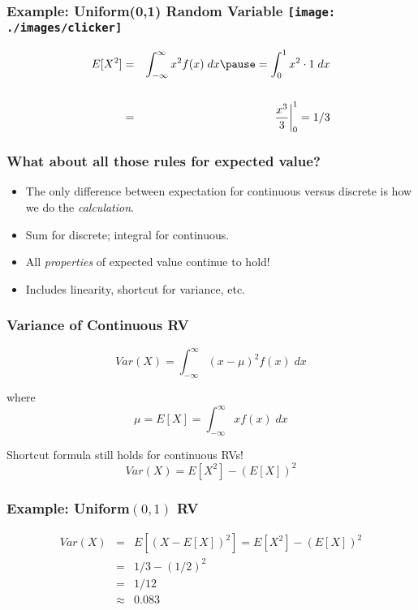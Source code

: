 
\begin{frame}
\frametitle{Example: Uniform(0,1) Random Variable \hfill \texttt{[image: ./images/clicker]}}
	\begin{eqnarray*}
	E[X^2] &=& \int_{-\infty}^\infty x^2 f(x) \; dx \pause = \int_0^1 x^2 \cdot 1 \; dx\\ \\
		&=& \left. \frac{x^3}{3}\right|_0^1 = 1/3
	\end{eqnarray*}
\end{frame}


\begin{frame}
\frametitle{What about all those rules for expected value?}
\begin{itemize}
  \item The only difference between expectation for continuous versus discrete is how we do the \emph{calculation}.
  \item Sum for discrete; integral for continuous.
  \item All \emph{properties} of expected value \alert{continue to hold!}
  \item Includes linearity, shortcut for variance, etc.
\end{itemize}
\end{frame}

\begin{frame}
\frametitle{Variance of Continuous RV}

$$\boxed{Var(X) = \int_{-\infty}^{\infty} (x - \mu)^2 f(x) \; dx}$$

\vspace{2em}
where
$$\mu = E[X]=\int_{-\infty}^\infty x f(x) \; dx $$

\vspace{2em}
\alert{Shortcut formula still holds for continuous RVs!}
	$$Var(X) = E[X^2] - \left(E[X]\right)^2$$
\end{frame}

\begin{frame}
\frametitle{Example: Uniform$(0,1)$ RV}
\begin{eqnarray*}
 Var(X) &=& E\left[ \left( X - E[X] \right)^2\right] = E[X^2] - \left(E[X]\right)^2\\
 	&=& 1/3  - (1/2)^2\\ 
 	&=& 1/12 \\
 	&\approx& 0.083
\end{eqnarray*}
\end{frame}

